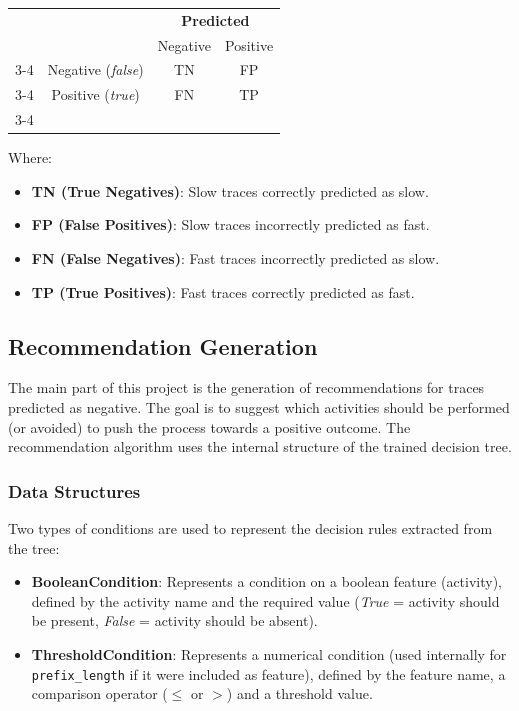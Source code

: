 \documentclass{article}
\begin{document}
\begin{center}
\begin{tabular}{cc|c|c|}
& \multicolumn{1}{c}{} & \multicolumn{2}{c}{\textbf{Predicted}} \\
& \multicolumn{1}{c}{} & \multicolumn{1}{c}{Negative}  & \multicolumn{1}{c}{Positive} \\\cline{3-4}
\multirow{2}{*}{\textbf{Actual}} & Negative (\textit{false}) & TN & FP \\\cline{3-4}
                        & Positive (\textit{true})  & FN & TP \\\cline{3-4}
\end{tabular}
\end{center}

\noindent
Where:
\begin{itemize}
    \item \textbf{TN (True Negatives)}: Slow traces correctly predicted as slow.
    \item \textbf{FP (False Positives)}: Slow traces incorrectly predicted as fast.
    \item \textbf{FN (False Negatives)}: Fast traces incorrectly predicted as slow.
    \item \textbf{TP (True Positives)}: Fast traces correctly predicted as fast.
\end{itemize}



\subsection{Recommendation Generation}

The main part of this project is the generation of recommendations for traces predicted as negative. The goal is to suggest which activities should be performed (or avoided) to push the process towards a positive outcome. The recommendation algorithm uses the internal structure of the trained decision tree.

\subsubsection{Data Structures}

Two types of conditions are used to represent the decision rules extracted from the tree:

\begin{itemize}
    \item \textbf{BooleanCondition}: Represents a condition on a boolean feature (activity), defined by the activity name and the required value (\textit{True} = activity should be present, \textit{False} = activity should be absent).
    \item \textbf{ThresholdCondition}: Represents a numerical condition (used internally for \texttt{prefix\_length} if it were included as feature), defined by the feature name, a comparison operator ($\leq$ or $>$) and a threshold value.
\end{itemize}
\end{document}
